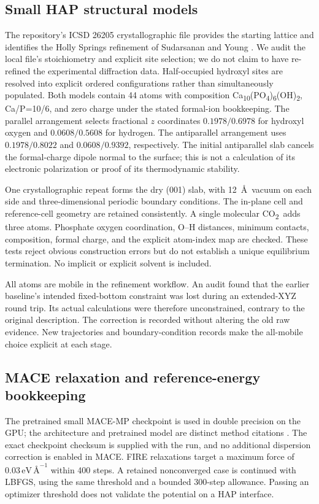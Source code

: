 \documentclass[11pt,a4paper]{article}
\newcommand{\COtwo}{CO\textsubscript{2}}
\newcommand{\HAP}{Ca\textsubscript{10}(PO\textsubscript{4})\textsubscript{6}(OH)\textsubscript{2}}
\newcommand{\forceunit}{\,\mathrm{eV}\,\text{\AA}^{-1}}
\begin{document}
\subsection{Small HAP structural models}
The repository's ICSD 26205 crystallographic file provides the starting lattice and identifies the Holly Springs refinement of Sudarsanan and Young \citep{Sudarsanan1969}. We audit the local file's stoichiometry and explicit site selection; we do not claim to have re-refined the experimental diffraction data. Half-occupied hydroxyl sites are resolved into explicit ordered configurations rather than simultaneously populated. Both models contain 44 atoms with composition \HAP, Ca/P=10/6, and zero charge under the stated formal-ion bookkeeping. The parallel arrangement selects fractional $z$ coordinates $0.1978/0.6978$ for hydroxyl oxygen and $0.0608/0.5608$ for hydrogen. The antiparallel arrangement uses $0.1978/0.8022$ and $0.0608/0.9392$, respectively. The initial antiparallel slab cancels the formal-charge dipole normal to the surface; this is not a calculation of its electronic polarization or proof of its thermodynamic stability.

One crystallographic repeat forms the dry (001) slab, with 12~\AA\ vacuum on each side and three-dimensional periodic boundary conditions. The in-plane cell and reference-cell geometry are retained consistently. A single molecular \COtwo\ adds three atoms. Phosphate oxygen coordination, O--H distances, minimum contacts, composition, formal charge, and the explicit atom-index map are checked. These tests reject obvious construction errors but do not establish a unique equilibrium termination. No implicit or explicit solvent is included.

All atoms are mobile in the refinement workflow. An audit found that the earlier baseline's intended fixed-bottom constraint was lost during an extended-XYZ round trip. Its actual calculations were therefore unconstrained, contrary to the original description. The correction is recorded without altering the old raw evidence. New trajectories and boundary-condition records make the all-mobile choice explicit at each stage.

\subsection{MACE relaxation and reference-energy bookkeeping}
The pretrained small MACE-MP checkpoint is used in double precision on the GPU; the architecture and pretrained model are distinct method citations \citep{Batatia2022MACE,Batatia2025MACEMP}. The exact checkpoint checksum is supplied with the run, and no additional dispersion correction is enabled in MACE. FIRE relaxations target a maximum force of $0.03\forceunit$ within 400 steps. A retained nonconverged case is continued with LBFGS, using the same threshold and a bounded 300-step allowance. Passing an optimizer threshold does not validate the potential on a HAP interface.
\end{document}
